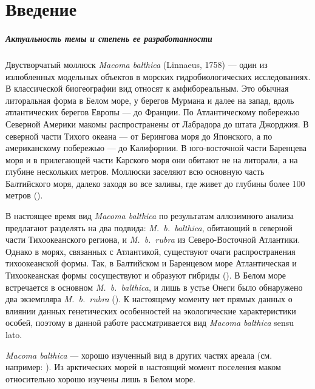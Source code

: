 \chapter*{Введение}

\paragraph {Актуальность темы и степень ее разработанности}
Двустворчатый моллюск {\it Macoma balthica} (Linnaeus, 1758) --- один из излюбленных модельных объектов в морских гидробиологических исследованиях. 
В классической биогеографии вид относят к амфибореальным. 
Это обычная литоральная форма в Белом море, у берегов Мурмана и далее на запад, вдоль атлантических берегов Европы --- до Франции. 
По Атлантическому побережью Северной Америки макомы распространены от Лабрадора до штата Джорджия. 
В северной части Тихого океана --- от Берингова моря до Японского, а по американскому побережью --- до Калифорнии. 
В юго-восточной части Баренцева моря и в прилегающей части Карского моря они обитают  не на литорали, а на глубине нескольких метров. 
Моллюски заселяют всю основную часть Балтийского моря, далеко заходя во все заливы, где живет до глубины более 100 метров (\cite{Zacepin_Filatova_1968}).

В настоящее время вид {\it Macoma balthica} по результатам аллозимного анализа предлагают разделять на два подвида: {\it M.~b.~balthica}, обитающий в северной части Тихоокеанского региона, и {\it M.~b.~rubra} из Северо-Восточной Атлантики. 
Однако  в морях, связанных с  Атлантикой, существуют очаги распространения тихоокеанской формы. 
Так, в Балтийском и Баренцевом море Атлантическая и Тихоокеанская формы сосуществуют и образуют гибриды (\cite{Vainola_2003}). 
В Белом море встречается в основном {\it M.~b.~balthica}, и лишь в устье Онеги было обнаружено два экземпляра {\it M.~b.~rubra} (\cite{Nikula_et_al_2007}).
К настоящему моменту нет прямых данных о влиянии данных генетических особенностей на экологические характеристики особей, поэтому в данной работе рассматривается вид {\it Macoma balthica} sensu lato.

{\it Macoma balthica} --- хорошо изученный вид в других частях ареала (см. например: \cite{Segerstrale_1960, Lavoie_1970, Gilbert_1978, Vincent_et_al_1989, Hiddink_et_al_2002_predation_epifauna, Hiddink_et_al_2002_predation_infauna, Beukema_et_al_2009}). 
Из арктических морей в настоящий момент поселения маком относительно хорошо изучены лишь в Белом море.

